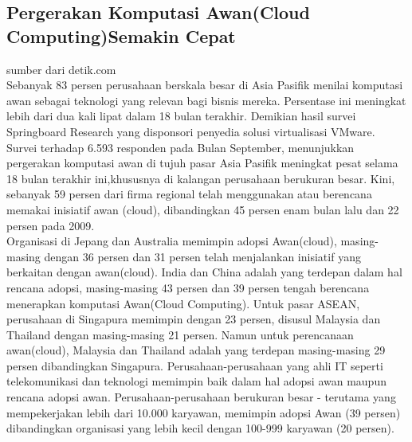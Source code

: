 \subsection{Pergerakan Komputasi Awan(Cloud Computing)Semakin Cepat}
\tab sumber dari detik.com \\Sebanyak 83 persen perusahaan berskala besar di Asia Pasifik menilai komputasi awan sebagai teknologi yang relevan bagi bisnis mereka. Persentase ini meningkat lebih dari dua kali lipat dalam 18 bulan terakhir. Demikian hasil survei Springboard Research yang disponsori penyedia solusi virtualisasi VMware. Survei terhadap 6.593 responden pada Bulan September, menunjukkan pergerakan komputasi awan di tujuh pasar Asia Pasifik meningkat pesat selama 18 bulan terakhir ini,khususnya di kalangan perusahaan berukuran besar. Kini, sebanyak 59 persen dari firma regional telah menggunakan atau berencana memakai inisiatif awan (cloud), dibandingkan 45 persen enam bulan lalu dan 22 persen pada 2009. \\Organisasi di Jepang dan Australia memimpin adopsi Awan(cloud), masing-masing dengan 36 persen dan 31 persen telah menjalankan inisiatif yang berkaitan dengan awan(cloud). India dan China adalah yang terdepan dalam hal rencana adopsi, masing-masing 43 persen dan 39 persen tengah berencana menerapkan komputasi Awan(Cloud Computing). Untuk pasar ASEAN, perusahaan di Singapura memimpin dengan 23 persen, disusul Malaysia dan Thailand dengan masing-masing 21 persen. Namun untuk perencanaan awan(cloud), Malaysia dan Thailand adalah yang terdepan masing-masing 29 persen dibandingkan Singapura. Perusahaan-perusahaan yang ahli IT seperti telekomunikasi dan teknologi memimpin baik dalam hal adopsi awan maupun rencana adopsi awan. Perusahaan-perusahaan berukuran besar - terutama yang mempekerjakan lebih dari 10.000 karyawan, memimpin adopsi Awan (39 persen) dibandingkan organisasi yang lebih kecil dengan 100-999 karyawan (20 persen).
